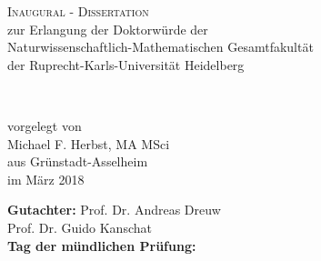 \begin{titlepage}
\begin{center}

	\Huge \textsc{Inaugural - Dissertation} \\[0.4cm]
	{\Large zur Erlangung der Doktorwürde der \\
	Naturwissenschaftlich-Mathematischen Gesamtfakultät \\
	der Ruprecht-Karls-Universität Heidelberg\\
	}

	\vfill

	{\Huge
	\textbf{\thesistitle}\\
	\vspace{0.5cm}
	\LARGE \thesissubtitle
	}

	\vfill

	{\large  vorgelegt von} \\
	\vspace{1.0cm}
	{\LARGE Michael F. Herbst, {\large \mbox{MA} \mbox{MSci}} }\\[-0.3em]
	{\large aus Grünstadt-Asselheim } \\
	\vspace{1.0cm}
	{\large im März 2018} \\

	\vspace{2cm}

	\begin{flushleft}
	\normalsize
	\textbf{Gutachter:} \hspace{0.6cm} Prof. Dr. Andreas Dreuw\\
						\hspace{2.69cm}  Prof. Dr. Guido Kanschat\\[0.3cm]
	\textbf{Tag der mündlichen Prüfung:} \hspace{0.6cm} \thesisdefense
	\end{flushleft}
\end{center}
\end{titlepage}

